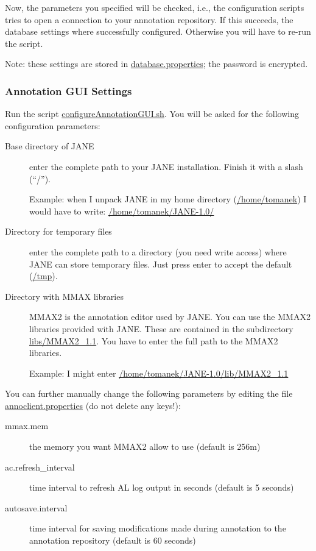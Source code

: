 \documentclass[DIV12,english,11pt,halfparskip]{scrartcl}
\begin{document}
Now, the parameters you specified will be checked, i.e., the
configuration scripts tries to open a connection to your annotation
repository. If this succeeds, the database settings where successfully
configured. Otherwise you will have to re-run the script.

Note: these settings are stored in \url{database.properties}; the
password is encrypted.


\subsubsection{Annotation GUI Settings}
Run the script \url{configureAnnotationGUI.sh}. You will be asked for
the following configuration parameters:

\begin{description}
\item [Base directory of JANE] enter the complete path to your JANE
  installation. Finish it with a slash (``/'').

  Example: when I unpack JANE in my home directory (\url{/home/tomanek})
  I would have to write: \url{/home/tomanek/JANE-1.0/}

\item[Directory for temporary files] enter the complete path to a
  directory (you need write access) where JANE can store
  temporary files. Just press enter to accept the default (\url{/tmp}).

\item[Directory with MMAX libraries] MMAX2 is the annotation editor
  used by JANE. You can use the MMAX2 libraries provided with JANE.
  These are contained in the subdirectory \url{libs/MMAX2_1.1}.  You
  have to enter the full path to the MMAX2 libraries.

  Example: I might enter
  \url{/home/tomanek/JANE-1.0/lib/MMAX2_1.1}
\end{description}

You can further manually change the following parameters by editing the file
\url{annoclient.properties} (do not delete any keys!):

\begin{description}
 \item[mmax.mem] the memory you want MMAX2 allow to use (default is 256m)
 \item[ac.refresh\_interval] time interval to refresh AL log output in
   seconds (default is 5 seconds)
 \item[autosave.interval] time interval for saving modifications made
   during annotation to the annotation repository (default is 60 seconds)
\end{description}
\end{document}
